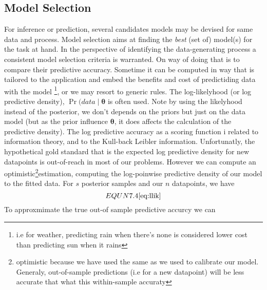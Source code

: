 \subsection{Model Selection}
For inference or prediction, several candidates models may be devised for same data and process. Model selection aims at finding the \textit{best} (set of) model(s) for the task at hand. In the perspective of identifying the data-generating process a consistent model selection criteria is warranted\parencite{Hoge:PrimerModelSelection:2018}.  On way of doing that is to compare their predictive accuracy. Sometime it can be computed in way that is tailored to the application and embed the benefits and cost of predictiding data with the model \footnote{i.e for weather, predicting rain when there's none is considered lower cost than predicting sun when it rains}, or we may resort to generic rules.
The log-likelyhood (or log predictive density), $\Pr(data \mid \boldsymbol\theta$  is often used. Note by using the likelyhood instead of the posterior, we don't depends on the priors but just on the data model (but as the prior influence $\boldsymbol\theta$, it does affects the calculation of the predictive density). The log predictive accuracy as a scoring function i related to information theory, and to the Kull-back Leibler information.
Unfortunatly, the hypothetical gold standard that is the expected log predictive density for new datapoints is out-of-reach in most of our problems. However we can compute an optimistic\footnote{optimistic because we have used the same as we used to calibrate our model. Generaly, out-of-sample predictions (i.e for a new datapoint) will be less accurate that what this within-sample accuraty}estimation, computing the log-poinwise predictive density of our model to the fitted data. For $s$ posterior samples and our $n$ datapoints, we have
\begin{equation}
	EQUN 7.4 \ref{eq:llik}
\end{equation}
To approxmimate the true out-of sample predictive accurcy we can 
